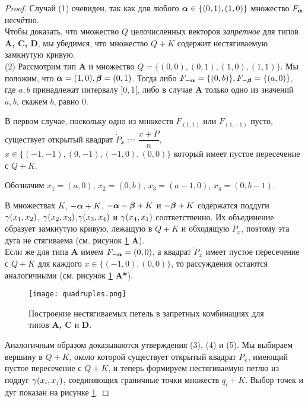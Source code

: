 \begin{proof} 

Случай (1) очевиден, так как для любого ${\bm{\alpha}}\in\{(0,1),(1,0)\}$ множество $F_{\bm{\alpha}}$ несчётно.\\

Чтобы доказать, что множество $Q$ целочисленных векторов {\em запретное} для типов {\bf A, C, D}, мы убедимся, что множество $Q+K$ содержит нестягиваемую замкнутую  кривую.\\

(2)  Рассмотрим тип {\bf A} и множество $Q=\{(0,0), (0,1), (1,0), (1,1)\}$. 
Мы положим, что ${\bm{\alpha}}=(1,0), {\bm{\beta}}=(0,1)$. 
Тогда   либо $F_{-{\bm{\alpha}}}=\{(0,b)\}, F_{-{\bm{\beta}}}=\{(a,0)\}$, где $a,b$ принадлежат интервалу $]0,1[$,  либо в случае {\bf A} только одно из значений $a,b$, скажем $b$, равно $0$.

В первом случае, поскольку одно из множеств $F_{(1,1)}$ или $F_{(1,-1)}$ пусто, существует открытый квадрат $\dot P_x:=\dfrac{x+\dot P}{n}$, $x\in \{(-1,-1),(0,-1), (-1,0), (0,0)\}$ который имеет пустое пересечение с $Q+K$. 

Обозначим $x_1=(a,0)$, $x_2=(0,b)$, $x_3=(a-1,0)$, $x_4=(0,b-1)$. 

В множествах  $K$, $-{\bm{\alpha}}+K$, $-{\bm{\alpha}}-{\bm{\beta}}+K$ и $-{\bm{\beta}}+K$ содержатся поддуги  $\gamma(x_1,x_2)$, $\gamma(x_2,x_3)$,$\gamma(x_3,x_4)$ и $\gamma(x_4,x_1)$ соответственно. 
Их объединение образует замкнутую кривую, лежащую в $Q+K$ и обходящую $\dot P_x$, поэтому эта дуга не стягиваема (см. рисунок \ref{forbid} {\bf A}).\\ 

Если же для типа {\bf A} имеем $F_{-{\bm{\alpha}}}=(0,0)$, а квадрат $\dot P_x$ имеет пустое пересечение с $Q+K$ для каждого $x\in\{(-1,0), (0,0)\}$, то рассуждения остаются аналогичными (см. рисунок \ref{forbid} {\bf A*}).\\

\begin{figure}[h] 
    \centering
    \texttt{[image: quadruples.png]}
    \caption{Построение нестягиваемых петель в запретных комбинациях для типов {\bf A, C} и {\bf D}.}
    \label{forbid}
\end{figure}

Аналогичным образом доказываются утверждения (3), (4) и (5).
Мы выбираем вершину в $Q+K$, около которой существует открытый квадрат $\dot P_x$, имеющий пустое пересечение с $Q+K$, и теперь формируем нестягиваемую петлю из поддуг $\gamma(x_i,x_j)$, соединяющих граничные точки множеств $q_i+K$.
Выбор точек и дуг показан на рисунке \ref{forbid}.
\end{proof}


